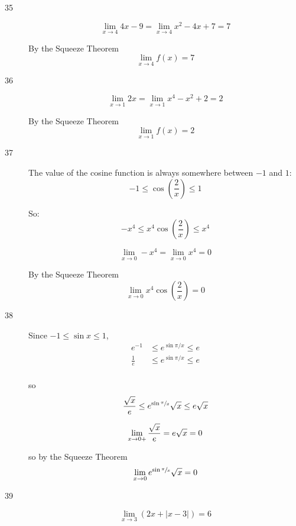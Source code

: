 \documentclass[letterpaper, landscape]{exam}
\begin{document}
\begin{description}
      \item[35]
        \[
          \lim_{x \to 4} 4x - 9 = \lim_{x \to 4} x^2 - 4x + 7 = 7
        \]

        By the Squeeze Theorem
        \[
          \lim_{x \to 4} f(x) = 7
        \]

      \item[36]
        \[
          \lim_{x \to 1} 2x = \lim_{x \to 1} x^4 - x^2 + 2 = 2
        \]

        By the Squeeze Theorem
        \[
          \lim_{x \to 1} f(x) = 2
        \]

      \item[37]
        The value of the cosine function is always somewhere between $-1$ and
        $1$:
        \[
          -1 \leq \cos \left( \frac{2}{x} \right) \leq 1
        \]

        So:
        \[
          -x^4 \leq x^4 \cos \left( \frac{2}{x}  \right) \leq x^4
        \]

        \[
          \lim_{x \to 0} -x^4 = \lim_{x \to 0} x^4 = 0
        \]

        By the Squeeze Theorem
        \[
          \lim_{x \to 0} x^4 \cos \left( \frac{2}{x} \right) = 0
        \]

      \item[38]
        Since $-1 \leq \sin x \leq 1$,
        \begin{align*}
          e^{-1}      & \leq e^{\sin{\pi/x}} \leq e \\
          \frac{1}{e} & \leq e^{\sin{\pi/x}} \leq e \\
        \end{align*}

        so
        \[
          \frac{\sqrt{x}}{e} \leq e^{\sin \sfrac{\pi}{x}} \sqrt{x} \leq e \sqrt{x}
        \]

        \[
          \lim_{x \to 0+} \frac{\sqrt{x}}{e} = e \sqrt{x} = 0 \\
        \]

        so by the Squeeze Theorem
        \[
          \lim_{x \to 0} e^{\sin \sfrac{\pi}{x}} \sqrt{x} = 0
        \]

      \item[39] 
        \[
          \lim_{x \to 3} (2x + |x - 3|) = \boxed{ 6 } 
        \]


\end{description}
\end{document}
